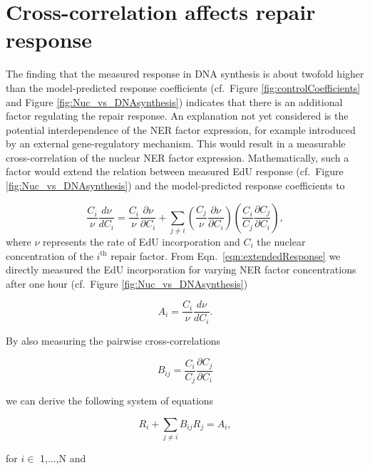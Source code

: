 \section{Cross-correlation affects repair response}
\label{sec:crossCorelResponse}
The finding that the measured response in DNA synthesis is about twofold higher than the model-predicted response coefficients (cf.\ Figure \ref{fig:controlCoefficients} and Figure \ref{fig:Nuc_vs_DNAsynthesis}) indicates that there is an additional factor regulating the repair response. An explanation not yet considered is the potential interdependence of the NER factor expression, for example introduced by an external gene-regulatory mechanism. This would result in a measurable cross-correlation of the nuclear NER factor expression. Mathematically, such a factor would extend the relation between measured EdU response (cf.\ Figure \ref{fig:Nuc_vs_DNAsynthesis}) and the model-predicted response coefficients to 

\begin{equation}
\frac{C_i}{\nu}\frac{d \nu}{d C_i} = \frac{C_i}{\nu}\frac{\partial \nu}{\partial C_i} + \sum_{j \neq i} \left( \frac{C_j}{\nu}\frac{\partial \nu}{\partial C_i}\right) \left(\frac{C_i}{C_j}\frac{\partial C_j}{\partial C_i}\right), 
\label{eqn:extendedResponse}
\end{equation}    
where $\nu$ represents the rate of EdU incorporation and $C_i$ the nuclear concentration of the $i^{\text{th}}$ repair factor. From Eqn.\ \ref{eqn:extendedResponse} we directly measured the EdU incorporation for varying NER factor concentrations after one hour (cf.\ Figure \ref{fig:Nuc_vs_DNAsynthesis})

\begin{equation}
A_i = \frac{C_i}{\nu}\frac{d \nu}{d C_i}. \nonumber
\end{equation}

By also measuring the pairwise cross-correlations

\begin{equation}
B_{ij} = \frac{C_i}{C_j}\frac{\partial C_j}{\partial C_i} \nonumber
\end{equation}

we can derive the following system of equations


\begin{equation}
R_i + \sum_{j\neq i} B_{ij}R_j = A_i,
\label{eqn:linearEqnSystem}
\end{equation}

for $i \in$ 1,...,N and

